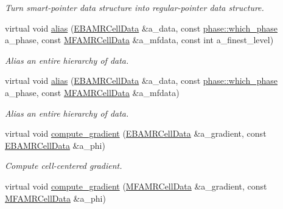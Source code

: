 \begin{DoxyCompactItemize}
\begin{DoxyCompactList}\small\item\em Turn smart-\/pointer data structure into regular-\/pointer data structure. \end{DoxyCompactList}\item 
virtual void \hyperlink{classamr__mesh_a23f2e4d37ccb4f03b838d1575f0f6f7e}{alias} (\hyperlink{type__definitions_8H_a7e610f301989e5e07781c5e338bdb7c3}{E\+B\+A\+M\+R\+Cell\+Data} \&a\+\_\+data, const \hyperlink{namespacephase_a23c76f548a5eb1955ed8c929c541108b}{phase\+::which\+\_\+phase} a\+\_\+phase, const \hyperlink{type__definitions_8H_aced885351d40daa466564acbee4042d3}{M\+F\+A\+M\+R\+Cell\+Data} \&a\+\_\+mfdata, const int a\+\_\+finest\+\_\+level)
\begin{DoxyCompactList}\small\item\em Alias an entire hierarchy of data. \end{DoxyCompactList}\item 
virtual void \hyperlink{classamr__mesh_a1b5ec9b2d030cbd16e594304a6f1dc48}{alias} (\hyperlink{type__definitions_8H_a7e610f301989e5e07781c5e338bdb7c3}{E\+B\+A\+M\+R\+Cell\+Data} \&a\+\_\+data, const \hyperlink{namespacephase_a23c76f548a5eb1955ed8c929c541108b}{phase\+::which\+\_\+phase} a\+\_\+phase, const \hyperlink{type__definitions_8H_aced885351d40daa466564acbee4042d3}{M\+F\+A\+M\+R\+Cell\+Data} \&a\+\_\+mfdata)
\begin{DoxyCompactList}\small\item\em Alias an entire hierarchy of data. \end{DoxyCompactList}\item 
virtual void \hyperlink{classamr__mesh_a26474e2d9a6a5f7e3a2e30042fab3542}{compute\+\_\+gradient} (\hyperlink{type__definitions_8H_a7e610f301989e5e07781c5e338bdb7c3}{E\+B\+A\+M\+R\+Cell\+Data} \&a\+\_\+gradient, const \hyperlink{type__definitions_8H_a7e610f301989e5e07781c5e338bdb7c3}{E\+B\+A\+M\+R\+Cell\+Data} \&a\+\_\+phi)
\begin{DoxyCompactList}\small\item\em Compute cell-\/centered gradient. \end{DoxyCompactList}\item 
virtual void \hyperlink{classamr__mesh_a9708fb12c8807e27ac999ead64910b20}{compute\+\_\+gradient} (\hyperlink{type__definitions_8H_aced885351d40daa466564acbee4042d3}{M\+F\+A\+M\+R\+Cell\+Data} \&a\+\_\+gradient, const \hyperlink{type__definitions_8H_aced885351d40daa466564acbee4042d3}{M\+F\+A\+M\+R\+Cell\+Data} \&a\+\_\+phi)

\end{DoxyCompactItemize}
